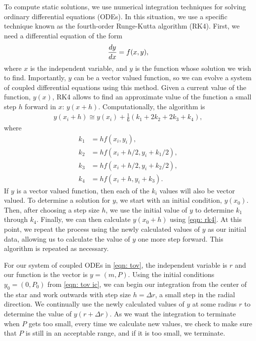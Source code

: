 To compute static solutions, we use numerical integration techniques for solving ordinary differential equations (ODEs). In this situation, we use a specific technique known as the fourth-order Runge-Kutta algorithm (RK4). First, we need a differential equation of the form
\[\dv{y}{x} = f(x, y),\]
where $x$ is the independent variable, and $y$ is the function whose solution we wish to find. Importantly, $y$ can be a vector valued function, so we can evolve a system of coupled differential equations using this method. Given a current value of the function, $y(x)$, RK4 allows to find an approximate value of the function a small step $h$ forward in $x$: $y(x+h)$. Computationally, the algorithm is
\begin{align}\label{eqn: rk4}
    y(x_i+h) \cong y(x_i) + \frac{1}{6}(k_1 + 2k_2 + 2k_3 + k_4),
\end{align}
where
\begin{align}
    k_1 & = h f(x_i, y_i),\nonumber\\
    k_2 & = h f(x_i+h/2, y_i+k_1/2),\nonumber\\
    k_3 & = h f(x_i+h/2, y_i+k_2/2),\nonumber\\
    k_4 & = h f(x_i +h, y_i + k_3).\nonumber
\end{align}
If $y$ is a vector valued function, then each of the $k_i$ values will also be vector valued. To determine a solution for $y$, we start with an initial condition, $y(x_0)$. Then, after choosing a step size $h$, we use the initial value of $y$ to determine $k_1$ through $k_4$. Finally, we can then calculate $y(x_0+h)$ using \eqref{eqn: rk4}. At this point, we repeat the process using the newly calculated values of $y$ as our initial data, allowing us to calculate the value of $y$ one more step forward. This algorithm is repeated as necessary.

For our system of coupled ODEs in \eqref{eqn: tov}, the independent variable is $r$ and our function is the vector is $y = (m, P)$. Using the initial conditions $y_0 = (0, P_0)$ from \eqref{eqn: tov ic}, we can begin our integration from the center of the star and work outwards with step size $h = \Delta r$, a small step in the radial direction. We continually use the newly calculated values of $y$ at some radius $r$ to determine the value of $y(r+\Delta r)$. As we want the integration to terminate when $P$ gets too small, every time we calculate new values, we check to make sure that $P$ is still in an acceptable range, and if it is too small, we terminate.

